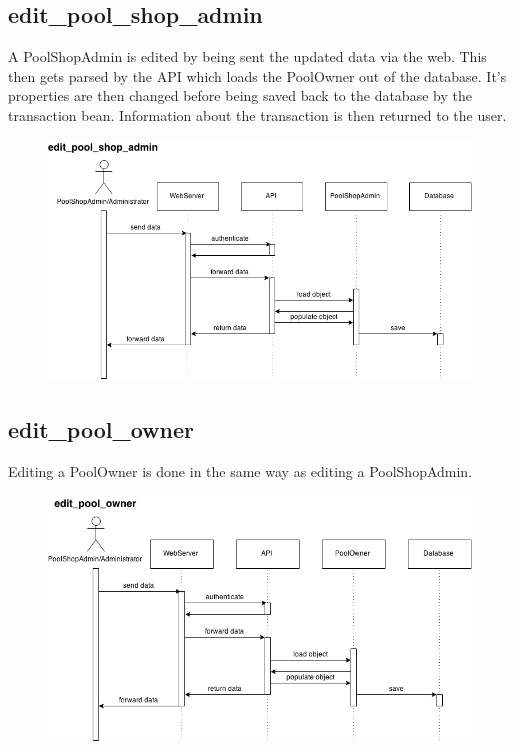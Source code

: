 \subsection{edit\_pool\_shop\_admin}
\par
A PoolShopAdmin is edited by being sent the updated data via the web. This then gets parsed by the API which loads the PoolOwner out of the database. It's properties are then changed before being saved back to the database by the transaction bean. Information about the transaction is then returned to the user.

\begin{figure}[!ht]
\begin{center}
	\includegraphics[width=14cm]{images/edit_pool_shop_admin}
\end{center}
\end{figure}
\FloatBarrier

\subsection{edit\_pool\_owner}
\par
Editing a PoolOwner is done in the same way as editing a PoolShopAdmin.

\begin{figure}[!ht]
\begin{center}
	\includegraphics[width=14cm]{images/edit_pool_owner}
\end{center}
\end{figure}
\FloatBarrier